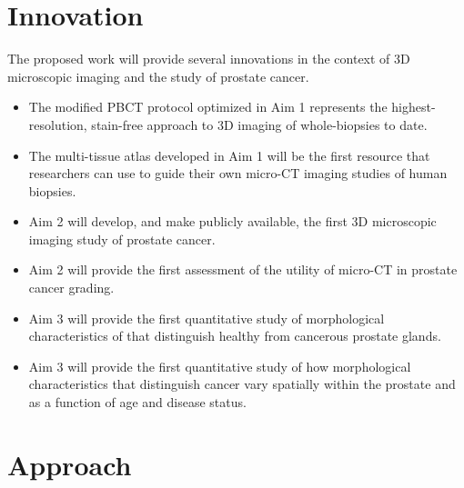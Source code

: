 \documentclass{NIHGrant}
\theoremstyle{theorem}
\begin{document}
\section*{Innovation}
The proposed work will provide several innovations in the context of 3D microscopic imaging and the study of prostate cancer.
\begin{itemize}[leftmargin=*, nosep]
\item The modified PBCT protocol optimized in Aim 1 represents the highest-resolution, stain-free approach to 3D imaging of whole-biopsies to date.
\item The multi-tissue atlas developed in Aim 1 will be the first resource that researchers can use to guide their own micro-CT imaging studies of human biopsies.
\item Aim 2 will develop, and make publicly available, the first 3D microscopic imaging study of prostate cancer.
\item Aim 2 will provide the first assessment of the utility of micro-CT in prostate cancer grading.
\item Aim 3 will provide the first quantitative study of morphological characteristics of that distinguish healthy from cancerous prostate glands.
\item Aim 3 will provide the first quantitative study of how morphological characteristics that distinguish cancer vary spatially within the prostate and as a function of age and disease status.
\end{itemize}
%
\section*{Approach}

\end{document}
